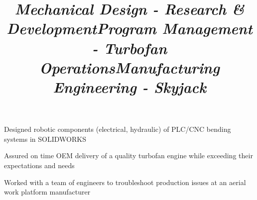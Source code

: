 \documentclass[mm]{res}
\begin{document}
\begin{resume}
\title{\textsl{Mechanical Design - Research \& Development}}
\begin{position}
\tb Designed robotic components (electrical, hydraulic) of PLC/CNC bending systems in SOLIDWORKS
\end{position}

\title{\textsl{Program Management - Turbofan Operations}}
\begin{position}
\tb Assured on time OEM delivery of a quality turbofan engine while exceeding their expectations and needs
\end{position}

\title{\textsl{Manufacturing Engineering - Skyjack}}
\begin{position}
\tb Worked with a team of engineers to troubleshoot production issues at an aerial work platform manufacturer
\end{position}




\end{resume}
\end{document}

